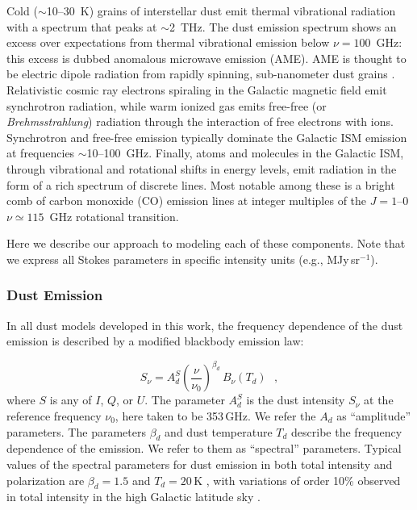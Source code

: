\documentclass[twocolumn]{aastex631}
\begin{document}
Cold ($\sim$10--30~K) grains of interstellar dust emit thermal vibrational radiation with a spectrum that peaks at $\sim$2~THz. The dust emission spectrum shows an excess over expectations from thermal vibrational emission below $\nu=100$~GHz: this excess is dubbed anomalous microwave emission (AME). AME is thought to be electric dipole radiation from rapidly spinning, sub-nanometer dust grains \citep{Draine:1998}. Relativistic cosmic ray electrons spiraling in the Galactic magnetic field emit synchrotron radiation, while warm ionized gas emits free-free (or \emph{Brehmsstrahlung}) radiation through the interaction of free electrons with ions. Synchrotron and free-free emission typically dominate the Galactic ISM emission at frequencies $\sim$10--100~GHz. Finally, atoms and molecules in the Galactic ISM, through vibrational and rotational shifts in energy levels, emit radiation in the form of a rich spectrum of discrete lines. Most notable among these is a bright comb of carbon monoxide (CO) emission lines at integer multiples of the $J=1$--$0$ $\nu \simeq 115$~GHz rotational transition.

Here we describe our approach to modeling each of these components. Note that we express all Stokes parameters in specific intensity units (e.g., MJy\,sr$^{-1}$).

\subsubsection{Dust Emission}
In all dust models developed in this work, the frequency dependence of the dust emission is described by a modified blackbody emission law:

\begin{equation} \label{eq:dust-emission-law}
    S_\nu = A_d^S \left(\frac{\nu}{\nu_0}\right)^{\beta_d} \, B_\nu(T_d)
    ~~~,
\end{equation}
where $S$ is any of $I$, $Q$, or $U$. The parameter $A_d^S$ is the dust intensity $S_\nu$ at the reference frequency $\nu_0$, here taken to be 353\,GHz. We refer the $A_d$ as ``amplitude'' parameters. The parameters $\beta_d$ and dust temperature $T_d$ describe the frequency dependence of the emission. We refer to them as ``spectral'' parameters. Typical values of the spectral parameters for dust emission in both total intensity and polarization are $\beta_d = 1.5$ and $T_d = 20$\,K \citep{planck2016-l11A}, with variations of order 10\% observed in total intensity in the high Galactic latitude sky \citep[e.g.,][]{planck2014-a12, planck2016-XLVIII}.
\end{document}
